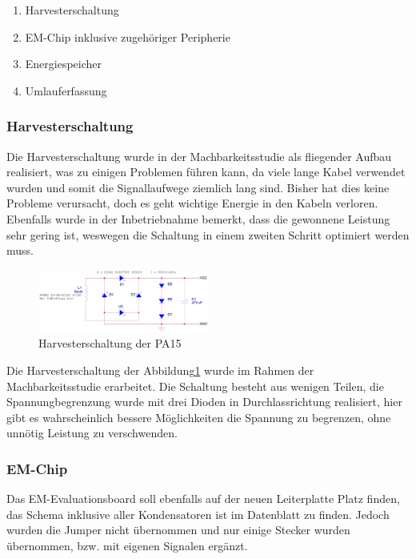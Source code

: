 \begin{enumerate}
    \item Harvesterschaltung
    \item EM-Chip inklusive zugehöriger Peripherie
    \item Energiespeicher
    \item Umlauferfassung
\end{enumerate}

\subsubsection{Harvesterschaltung}
Die Harvesterschaltung wurde in der Machbarkeitsstudie als fliegender Aufbau realisiert, was zu einigen Problemen führen kann, da viele lange Kabel verwendet wurden und somit die Signallaufwege ziemlich lang sind. Bisher hat dies keine Probleme verursacht, doch es geht wichtige Energie in den Kabeln verloren. Ebenfalls wurde in der Inbetriebnahme bemerkt, dass die gewonnene Leistung sehr gering ist, weswegen die Schaltung in einem zweiten Schritt optimiert werden muss.

\begin{figure}[ht]
    \includegraphics[width=0.5\textwidth]{3Vorgehen/imag/Schema_Harvester_PA.png}
    \caption{Harvesterschaltung der PA15}
    \label{schema_harvester_pa15} 
\end{figure}

Die Harvesterschaltung der Abbildung\ref{schema_harvester_pa15} wurde im Rahmen der Machbarkeitsstudie erarbeitet. Die Schaltung besteht aus wenigen Teilen, die Spannungbegrenzung wurde mit drei Dioden in Durchlassrichtung realisiert, hier gibt es wahrscheinlich bessere Möglichkeiten die Spannung zu begrenzen, ohne unnötig Leistung zu verschwenden.

\subsubsection{EM-Chip}

Das EM-Evaluationsboard soll ebenfalls auf der neuen Leiterplatte Platz finden, das Schema inklusive aller Kondensatoren ist im Datenblatt zu finden. Jedoch wurden die Jumper nicht übernommen und nur einige Stecker wurden übernommen, bzw. mit eigenen Signalen ergänzt.

